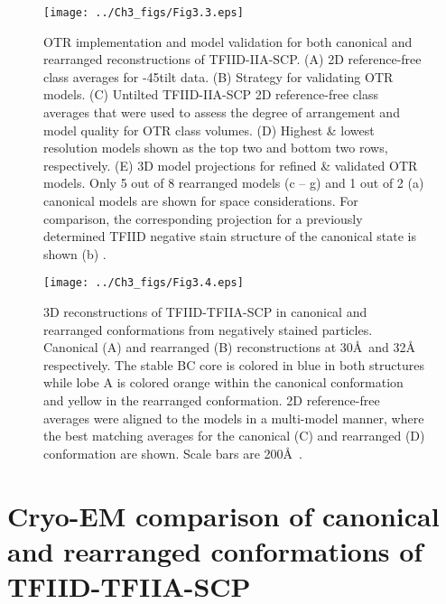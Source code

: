 \begin{figure}
\centering
\texttt{[image: ../Ch3\_figs/Fig3.3.eps]}
\caption[OTR implementation and model validation for both canonical and rearranged reconstructions of TFIID-IIA-SCP]{OTR implementation and model validation for both canonical and rearranged reconstructions of TFIID-IIA-SCP. (A) 2D reference-free class averages for -45\textdegree tilt data.  (B) Strategy for validating OTR models.  (C) Untilted TFIID-IIA-SCP 2D reference-free class averages that were used to assess the degree of arrangement and model quality for OTR class volumes. (D) Highest \& lowest resolution models shown as the top two and bottom two rows, respectively.  (E) 3D model projections for refined \& validated OTR models.  Only 5 out of 8 rearranged models (c – g) and 1 out of 2 (a) canonical models are shown for space considerations.  For comparison, the corresponding projection for a previously determined TFIID negative stain structure of the canonical state is shown (b) \cite{Grob_1281}.}
\label{fig:Fig3.3}
\end{figure}
\begin{figure}
\centering
\texttt{[image: ../Ch3\_figs/Fig3.4.eps]}
\caption[3D reconstructions of TFIID-TFIIA-SCP in canonical and rearranged conformations from negatively stained particles]{3D reconstructions of TFIID-TFIIA-SCP in canonical and rearranged conformations from negatively stained particles.  Canonical (A) and rearranged (B) reconstructions at 30\AA\ and 32\AA\, respectively. The stable BC core is colored in blue in both structures while lobe A is colored orange within the canonical conformation and yellow in the rearranged conformation.  2D reference-free averages were aligned to the models in a multi-model manner, where the best matching averages for the canonical (C) and rearranged (D) conformation are shown.  Scale bars are 200\AA\ .}
\label{fig:Fig3.4}
\end{figure}

\section{Cryo-EM comparison of canonical and rearranged conformations of TFIID-TFIIA-SCP}

